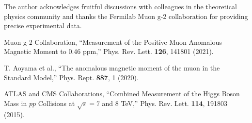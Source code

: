 \documentclass[12pt,a4paper]{article}
\begin{document}
	The author acknowledges fruitful discussions with colleagues in the theoretical physics community and thanks the Fermilab Muon g-2 collaboration for providing precise experimental data.
	
	\begin{thebibliography}{99}
		
		Muon g-2 Collaboration, ``Measurement of the Positive Muon Anomalous Magnetic Moment to 0.46 ppm,'' Phys. Rev. Lett. \textbf{126}, 141801 (2021).
		
		T. Aoyama et al., ``The anomalous magnetic moment of the muon in the Standard Model,'' Phys. Rept. \textbf{887}, 1 (2020).
		
		ATLAS and CMS Collaborations, ``Combined Measurement of the Higgs Boson Mass in $pp$ Collisions at $\sqrt{s} = 7$ and 8 TeV,'' Phys. Rev. Lett. \textbf{114}, 191803 (2015).
		
	\end{thebibliography}
	
\end{document}
